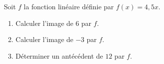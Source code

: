 
Soit $f$ la fonction linéaire définie par $f(x)=4,5x$.
\begin{enumerate}
\item Calculer l'image de $6$ par $f$.
\item Calculer l'image de $-3$ par $f$.
\item Déterminer un antécédent de $12$ par $f$.
\end{enumerate}

